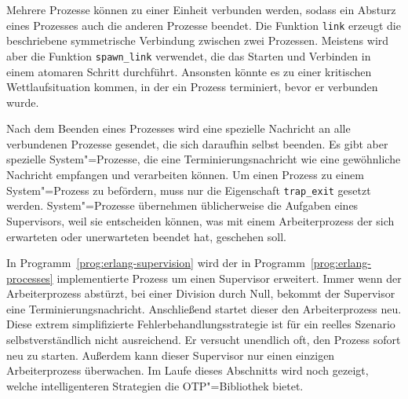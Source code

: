 Mehrere Prozesse können zu einer Einheit verbunden werden, sodass ein Absturz eines Prozesses auch die anderen Prozesse beendet. Die Funktion \lstinline{link} erzeugt die beschriebene symmetrische Verbindung zwischen zwei Prozessen. Meistens wird aber die Funktion \lstinline{spawn_link} verwendet, die das Starten und Verbinden in einem atomaren Schritt durchführt. Ansonsten könnte es zu einer kritischen Wettlaufsituation kommen, in der ein Prozess terminiert, bevor er verbunden wurde.

Nach dem Beenden eines Prozesses wird eine spezielle Nachricht an alle verbundenen Prozesse gesendet, die sich daraufhin selbst beenden. Es gibt aber spezielle System"=Prozesse, die eine Terminierungsnachricht wie eine gewöhnliche Nachricht empfangen und verarbeiten können. Um einen Prozess zu einem System"=Prozess zu befördern, muss nur die Eigenschaft \lstinline{trap_exit} gesetzt werden. System"=Prozesse übernehmen üblicherweise die Aufgaben eines Supervisors, weil sie entscheiden können, was mit einem Arbeiterprozess der sich erwarteten oder unerwarteten beendet hat, geschehen soll.

In Programm~\ref{prog:erlang-supervision} wird der in Programm~\ref{prog:erlang-processes} implementierte Prozess um einen Supervisor erweitert. Immer wenn der Arbeiterprozess abstürzt, \zB bei einer Division durch Null, bekommt der Supervisor eine Terminierungsnachricht. Anschließend startet dieser den Arbeiterprozess neu. Diese extrem simplifizierte Fehlerbehandlungsstrategie ist für ein reelles Szenario selbstverständlich nicht ausreichend. Er versucht unendlich oft, den Prozess sofort neu zu starten. Außerdem kann dieser Supervisor nur einen einzigen Arbeiterprozess überwachen. Im Laufe dieses Abschnitts wird noch gezeigt, welche intelligenteren Strategien die OTP"=Bibliothek bietet.

